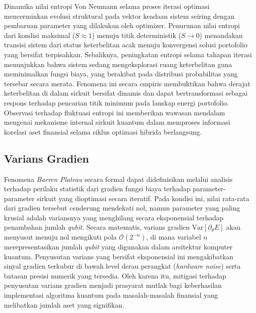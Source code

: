 Dinamika nilai entropi Von Neumann selama proses iterasi optimasi mencerminkan evolusi struktural pada vektor keadaan sistem seiring dengan pembaruan parameter yang dilakukan oleh optimizer. Penurunan nilai entropi dari kondisi maksimal ($S \approx 1$) menuju titik deterministik ($S \to 0$) menandakan transisi sistem dari status keterbelitan acak menuju konvergensi solusi portofolio yang bersifat terpisahkan. Sebaliknya, peningkatan entropi selama tahapan iterasi menunjukkan bahwa sistem sedang mengeksplorasi ruang keterbelitan guna meminimalkan fungsi biaya, yang berakibat pada distribusi probabilitas yang tersebar secara merata. Fenomena ini secara empiris membuktikan bahwa derajat keterbelitan di dalam sirkuit bersifat dinamis dan dapat bertransformasi sebagai respons terhadap pencarian titik minimum pada lanskap energi portofolio. Observasi terhadap fluktuasi entropi ini memberikan wawasan mendalam mengenai mekanisme internal sirkuit kuantum dalam memproses informasi korelasi aset finansial selama siklus optimasi hibrida berlangsung.

\subsection{Varians Gradien}
Fenomena \textit{Barren Plateau} secara formal dapat didefinisikan melalui analisis terhadap perilaku statistik dari gradien fungsi biaya terhadap parameter-parameter sirkuit yang dioptimasi secara iteratif. Pada kondisi ini, nilai rata-rata dari gradien tersebut cenderung mendekati nol, namun parameter yang paling krusial adalah variansnya yang menghilang secara eksponensial terhadap penambahan jumlah \textit{qubit}. Secara matematis, varians gradien $\text{Var}[\partial_{\theta} E]$ akan menyusut menuju nol mengikuti pola $\mathcal{O}(2^{-n})$, di mana variabel $n$ merepresentasikan jumlah \textit{qubit} yang digunakan dalam arsitektur komputer kuantum. Penyusutan varians yang bersifat eksponensial ini mengakibatkan sinyal gradien terkubur di bawah level derau perangkat (\textit{hardware noise}) serta batasan presisi numerik yang tersedia. Oleh karena itu, mitigasi terhadap penyusutan varians gradien menjadi prasyarat mutlak bagi keberhasilan implementasi algoritma kuantum pada masalah-masalah finansial yang melibatkan jumlah aset yang signifikan.

